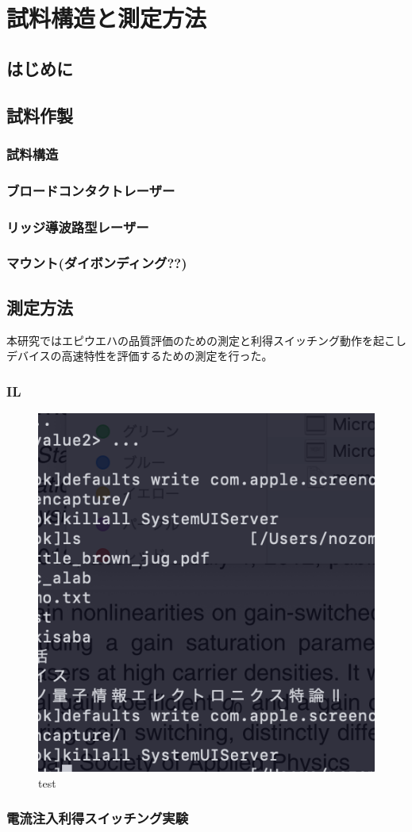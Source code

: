 
\chapter{試料構造と測定方法}

\section{はじめに}

\section{試料作製}
\subsection{試料構造}
\subsection{ブロードコンタクトレーザー}
\subsection{リッジ導波路型レーザー}
\subsection{マウント(ダイボンディング??)}
\section{測定方法}
本研究ではエピウエハの品質評価のための測定と利得スイッチング動作を起こしデバイスの高速特性を評価するための測定を行った。
\subsection{IL}
\begin{figure}[htbp]
	\includegraphics[width=15cm]{./test_fig.png}
	\caption{test}
\end{figure}
\subsection{電流注入利得スイッチング実験}
